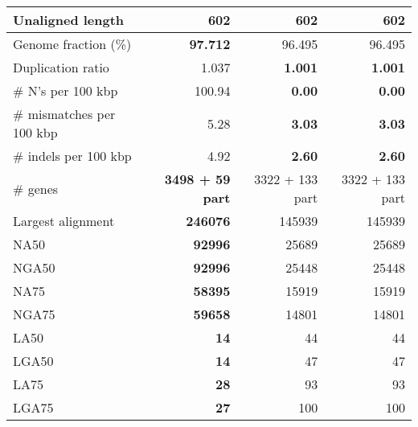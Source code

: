 \documentclass[12pt,a4paper]{article}
\begin{document}
\begin{table}[ht]
\begin{center}
\begin{tabular}{|l*{3}{|r}|}
Unaligned length & 602 & 602 & 602 \\ \hline
Genome fraction (\%) & {\bf 97.712} & 96.495 & 96.495 \\ \hline
Duplication ratio & 1.037 & {\bf 1.001} & {\bf 1.001} \\ \hline
\# N's per 100 kbp & 100.94 & {\bf 0.00} & {\bf 0.00} \\ \hline
\# mismatches per 100 kbp & 5.28 & {\bf 3.03} & {\bf 3.03} \\ \hline
\# indels per 100 kbp & 4.92 & {\bf 2.60} & {\bf 2.60} \\ \hline
\# genes & {\bf 3498 + 59 part} & 3322 + 133 part & 3322 + 133 part \\ \hline
Largest alignment & {\bf 246076} & 145939 & 145939 \\ \hline
NA50 & {\bf 92996} & 25689 & 25689 \\ \hline
NGA50 & {\bf 92996} & 25448 & 25448 \\ \hline
NA75 & {\bf 58395} & 15919 & 15919 \\ \hline
NGA75 & {\bf 59658} & 14801 & 14801 \\ \hline
LA50 & {\bf 14} & 44 & 44 \\ \hline
LGA50 & {\bf 14} & 47 & 47 \\ \hline
LA75 & {\bf 28} & 93 & 93 \\ \hline
LGA75 & {\bf 27} & 100 & 100 \\ \hline
\end{tabular}
\end{center}
\end{table}
\end{document}
